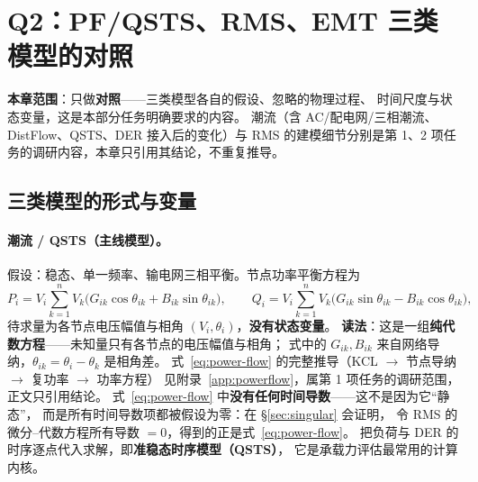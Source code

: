 \section{Q2：PF/QSTS、RMS、EMT 三类模型的对照}
\label{sec:q2}

\noindent\textbf{本章范围}：只做\textbf{对照}——三类模型各自的假设、忽略的物理过程、
时间尺度与状态变量，这是本部分任务明确要求的内容。
潮流（含 AC/配电网/三相潮流、DistFlow、QSTS、DER 接入后的变化）与
RMS 的建模细节分别是第 1、2 项任务的调研内容，本章只引用其结论，不重复推导。

\subsection{三类模型的形式与变量}

\paragraph{潮流 / QSTS（主线模型）。}
假设：稳态、单一频率、输电网三相平衡。节点功率平衡方程为\cite{kundur1994,sauer1998}
\begin{equation}
P_i=V_i\sum_{k=1}^{n}V_k\bigl(G_{ik}\cos\theta_{ik}+B_{ik}\sin\theta_{ik}\bigr),\qquad
Q_i=V_i\sum_{k=1}^{n}V_k\bigl(G_{ik}\sin\theta_{ik}-B_{ik}\cos\theta_{ik}\bigr),
\label{eq:power-flow}
\end{equation}
待求量为各节点电压幅值与相角 $(V_i,\theta_i)$，\textbf{没有状态变量}。
\textbf{读法}：这是一组\textbf{纯代数方程}——未知量只有各节点的电压幅值与相角；
式中的 $G_{ik},B_{ik}$ 来自网络导纳，$\theta_{ik}=\theta_i-\theta_k$ 是相角差。
式~\eqref{eq:power-flow} 的完整推导（KCL $\to$ 节点导纳 $\to$ 复功率 $\to$ 功率方程）
见附录~\ref{app:powerflow}，属第 1 项任务的调研范围，正文只引用结论。
式~\eqref{eq:power-flow} 中\textbf{没有任何时间导数}——这不是因为它“静态”，
而是所有时间导数项都被假设为零：在 \S\ref{sec:singular} 会证明，
令 RMS 的微分--代数方程所有导数 $=0$，得到的正是式~\eqref{eq:power-flow}。
把负荷与 DER 的时序逐点代入求解，即\textbf{准稳态时序模型（QSTS）}，
它是承载力评估最常用的计算内核\cite{dlt2041,ge2023}。


